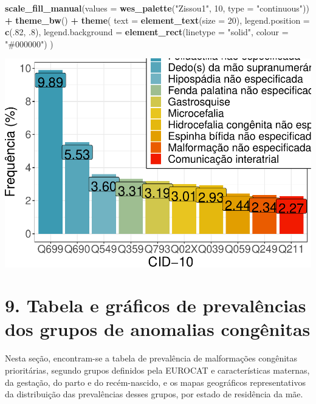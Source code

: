 \documentclass[
]{article}
\newenvironment{Shaded}{\begin{snugshade}}{\end{snugshade}}
\newcommand{\AttributeTok}[1]{\textcolor[rgb]{0.13,0.29,0.53}{#1}}
\newcommand{\DecValTok}[1]{\textcolor[rgb]{0.00,0.00,0.81}{#1}}
\newcommand{\FunctionTok}[1]{\textcolor[rgb]{0.13,0.29,0.53}{\textbf{#1}}}
\newcommand{\NormalTok}[1]{#1}
\newcommand{\SpecialCharTok}[1]{\textcolor[rgb]{0.81,0.36,0.00}{\textbf{#1}}}
\newcommand{\StringTok}[1]{\textcolor[rgb]{0.31,0.60,0.02}{#1}}
\begin{document}
\begin{Shaded}
\begin{Highlighting}[]
    \FunctionTok{scale\_fill\_manual}\NormalTok{(}\AttributeTok{values =} \FunctionTok{wes\_palette}\NormalTok{(}\StringTok{"Zissou1"}\NormalTok{, }\DecValTok{10}\NormalTok{, }\AttributeTok{type =} \StringTok{"continuous"}\NormalTok{)) }\SpecialCharTok{+}
    \FunctionTok{theme\_bw}\NormalTok{() }\SpecialCharTok{+}
    \FunctionTok{theme}\NormalTok{(}
      \AttributeTok{text =} \FunctionTok{element\_text}\NormalTok{(}\AttributeTok{size =} \DecValTok{20}\NormalTok{),}
      \AttributeTok{legend.position =} \FunctionTok{c}\NormalTok{(.}\DecValTok{82}\NormalTok{, .}\DecValTok{8}\NormalTok{),}
      \AttributeTok{legend.background =} \FunctionTok{element\_rect}\NormalTok{(}\AttributeTok{linetype =} \StringTok{"solid"}\NormalTok{, }\AttributeTok{colour =} \StringTok{"\#000000"}\NormalTok{)}
\NormalTok{    )}
\end{Highlighting}
\end{Shaded}

\includegraphics{anom_files/figure-latex/unnamed-chunk-36-1.pdf}

\newpage

\hypertarget{tabela-e-gruxe1ficos-de-prevaluxeancias-dos-grupos-de-anomalias-conguxeanitas}{%
\section{9. Tabela e gráficos de prevalências dos grupos de anomalias
congênitas}\label{tabela-e-gruxe1ficos-de-prevaluxeancias-dos-grupos-de-anomalias-conguxeanitas}}

Nesta seção, encontram-se a tabela de prevalência de malformações
congênitas prioritárias, segundo grupos definidos pela EUROCAT e
características maternas, da gestação, do parto e do recém-nascido, e os
mapas geográficos representativos da distribuição das prevalências
desses grupos, por estado de residência da mãe.
\end{document}
